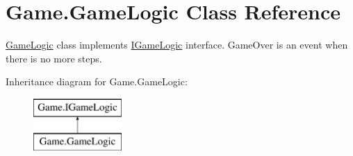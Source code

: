 \hypertarget{class_game_1_1_game_logic}{}\section{Game.\+Game\+Logic Class Reference}
\label{class_game_1_1_game_logic}


\mbox{\hyperlink{class_game_1_1_game_logic}{Game\+Logic}} class implements \mbox{\hyperlink{interface_game_1_1_i_game_logic}{I\+Game\+Logic}} interface. Game\+Over is an event when there is no more steps.  


Inheritance diagram for Game.\+Game\+Logic\+:\begin{figure}[H]
\begin{center}
\leavevmode
\includegraphics[height=2.000000cm]{class_game_1_1_game_logic}
\end{center}
\end{figure}
